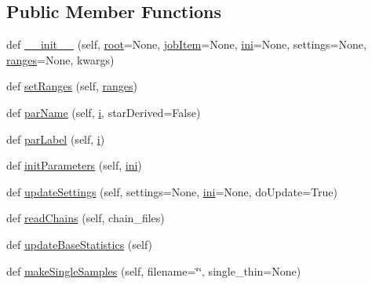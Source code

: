 \subsection*{Public Member Functions}
\begin{DoxyCompactItemize}
\item 
def \mbox{\hyperlink{classgetdist_1_1mcsamples_1_1MCSamples_a483006ab43cb5e5e57129dc3977db2a5}{\+\_\+\+\_\+init\+\_\+\+\_\+}} (self, \mbox{\hyperlink{classgetdist_1_1chains_1_1Chains_ae8dd7bf3c841a906ae7d6b3c83326c75}{root}}=None, \mbox{\hyperlink{classgetdist_1_1chains_1_1Chains_a0437ab45f665cbdd53ae01c4b91fd797}{job\+Item}}=None, \mbox{\hyperlink{classgetdist_1_1mcsamples_1_1MCSamples_a770e848532e7a9eeb2b0f24cb1bc1573}{ini}}=None, settings=None, \mbox{\hyperlink{classgetdist_1_1mcsamples_1_1MCSamples_a1eaeedbeacddc790c82c6b160d266373}{ranges}}=None, kwargs)
\item 
def \mbox{\hyperlink{classgetdist_1_1mcsamples_1_1MCSamples_aa8eab52322d3b2e920bcc24a223c5514}{set\+Ranges}} (self, \mbox{\hyperlink{classgetdist_1_1mcsamples_1_1MCSamples_a1eaeedbeacddc790c82c6b160d266373}{ranges}})
\item 
def \mbox{\hyperlink{classgetdist_1_1mcsamples_1_1MCSamples_a785dc1b8abd13411a1efa1e2f626fc26}{par\+Name}} (self, \mbox{\hyperlink{plotTT_8m_a3359ed5f123e10953f77a90207beaa1b}{i}}, star\+Derived=False)
\item 
def \mbox{\hyperlink{classgetdist_1_1mcsamples_1_1MCSamples_aec090ebdf609820d084391a9901f0214}{par\+Label}} (self, \mbox{\hyperlink{plotTT_8m_a3359ed5f123e10953f77a90207beaa1b}{i}})
\item 
def \mbox{\hyperlink{classgetdist_1_1mcsamples_1_1MCSamples_af5783ec0e78ebfceda4c0af135407236}{init\+Parameters}} (self, \mbox{\hyperlink{classgetdist_1_1mcsamples_1_1MCSamples_a770e848532e7a9eeb2b0f24cb1bc1573}{ini}})
\item 
def \mbox{\hyperlink{classgetdist_1_1mcsamples_1_1MCSamples_a772230a5fe44bf20fbc220a44563ca1c}{update\+Settings}} (self, settings=None, \mbox{\hyperlink{classgetdist_1_1mcsamples_1_1MCSamples_a770e848532e7a9eeb2b0f24cb1bc1573}{ini}}=None, do\+Update=True)
\item 
def \mbox{\hyperlink{classgetdist_1_1mcsamples_1_1MCSamples_a4573e1e3c4919d77f2c9552d8e3f6ab0}{read\+Chains}} (self, chain\+\_\+files)
\item 
def \mbox{\hyperlink{classgetdist_1_1mcsamples_1_1MCSamples_aff509a0c9efdb8ea56bc44cf7d11c328}{update\+Base\+Statistics}} (self)
\item 
def \mbox{\hyperlink{classgetdist_1_1mcsamples_1_1MCSamples_af99f9e955d6d0b21766aae9e7bb9c17f}{make\+Single\+Samples}} (self, filename=\char`\"{}\char`\"{}, single\+\_\+thin=None)

\end{DoxyCompactItemize}
